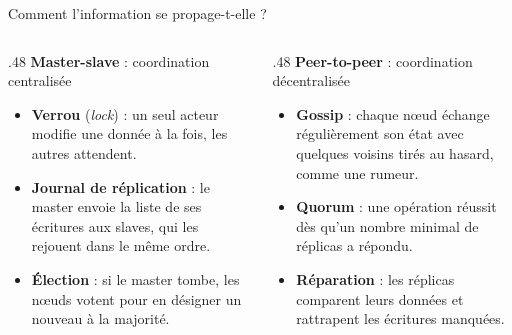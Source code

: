 \begin{frame}{Comment l'information se propage-t-elle ?}
    \begin{columns}[T,onlytextwidth]
        \begin{column}{.48\textwidth}
            \textbf{Master-slave} : coordination centralisée
            \begin{itemize}
                \item \textbf{Verrou} (\textit{lock}) : un seul acteur modifie
                      une donnée à la fois, les autres attendent.
                \item \textbf{Journal de réplication} : le master envoie la
                      liste de ses écritures aux slaves, qui les rejouent dans
                      le même ordre.
                \item \textbf{Élection} : si le master tombe, les nœuds votent
                      pour en désigner un nouveau à la majorité.
            \end{itemize}
        \end{column}
        \begin{column}{.48\textwidth}
            \textbf{Peer-to-peer} : coordination décentralisée
            \begin{itemize}
                \item \textbf{Gossip} : chaque nœud échange régulièrement son
                      état avec quelques voisins tirés au hasard, comme une
                      rumeur.
                \item \textbf{Quorum} : une opération réussit dès qu'un nombre
                      minimal de réplicas a répondu.
                \item \textbf{Réparation} : les réplicas comparent leurs données
                      et rattrapent les écritures manquées.
            \end{itemize}
        \end{column}
    \end{columns}

\end{frame}


